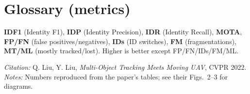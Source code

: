 \documentclass[10pt]{article}
\begin{document}
\section*{Glossary (metrics)}
\textbf{IDF1} (Identity F1), \textbf{IDP} (Identity Precision), \textbf{IDR} (Identity Recall), \textbf{MOTA}, \textbf{FP/FN} (false positives/negatives), \textbf{IDs} (ID switches), \textbf{FM} (fragmentations), \textbf{MT/ML} (mostly tracked/lost). Higher is better except FP/FN/IDs/FM/ML.

\vfill
\footnotesize\textit{Citation:} Q. Liu, Y. Liu, \emph{Multi-Object Tracking Meets Moving UAV}, CVPR 2022.\\
\textit{Notes:} Numbers reproduced from the paper's tables; see their Figs.~2--3 for diagrams.
\end{document}
